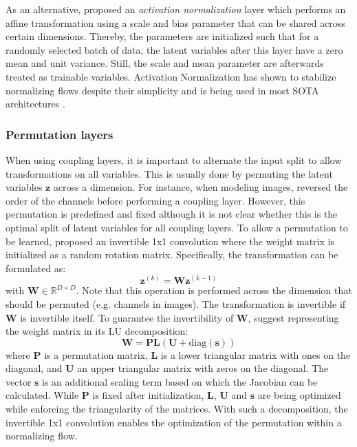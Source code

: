 As an alternative, \citet{Glow} proposed an \textit{activation normalization} layer which performs an affine transformation using a scale and bias parameter that can be shared across certain dimensions. 
Thereby, the parameters are initialized such that for a randomly selected batch of data, the latent variables after this layer have a zero mean and unit variance. 
Still, the scale and mean parameter are afterwards treated as trainable variables. 
Activation Normalization has shown to stabilize normalizing flows despite their simplicity and is being used in most \acl{SOTA} architectures \cite{Glow, Flow++, FloWaveNet, VFlow, EmielDequantization}.

\subsubsection{Permutation layers}
When using coupling layers, it is important to alternate the input split to allow transformations on all variables. 
This is usually done by permuting the latent variables $\bm{z}$ across a dimension. 
For instance, when modeling images, \citet{RealNVP} reversed the order of the channels before performing a coupling layer.
However, this permutation is predefined and fixed although it is not clear whether this is the optimal split of latent variables for all coupling layers.
To allow a permutation to be learned, \citet{Glow} proposed an invertible 1x1 convolution where the weight matrix is initialized as a random rotation matrix. 
Specifically, the transformation can be formulated as:
\begin{equation}
    \bm{z}^{(k)} = \bm{W}\bm{z}^{(k-1)}
\end{equation}
with $\bm{W}\in\mathbb{R}^{D\times D}$. 
Note that this operation is performed across the dimension that should be permuted (e.g. channels in images).
The transformation is invertible if $\bm{W}$ is invertible itself. 
To guarantee the invertibility of $\bm{W}$, \citet{Glow} suggest representing the weight matrix in its LU decomposition:
\begin{equation}
    \bm{W} = \bm{P}\bm{L}\left(\bm{U} + \text{diag}\left(\bm{s}\right)\right)
\end{equation}
where $\bm{P}$ is a permutation matrix, $\bm{L}$ is a lower triangular matrix with ones on the diagonal, and $\bm{U}$ an upper triangular matrix with zeros on the diagonal. 
The vector $\bm{s}$ is an additional scaling term based on which the Jacobian can be calculated. 
While $\bm{P}$ is fixed after initialization, $\bm{L}$, $\bm{U}$ and $\bm{s}$ are being optimized while enforcing the triangularity of the matrices.
With such a decomposition, the invertible 1x1 convolution enables the optimization of the permutation within a normalizing flow. 
